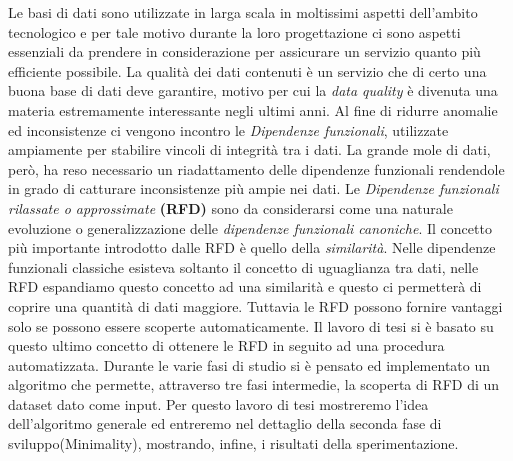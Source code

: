 Le basi di dati sono utilizzate in larga scala in moltissimi aspetti dell'ambito tecnologico e per tale motivo durante la loro progettazione ci sono aspetti essenziali da prendere in considerazione per assicurare un servizio quanto più efficiente possibile.
La qualità dei dati contenuti è un servizio che di certo una buona base di dati deve garantire, motivo per cui la \emph{data quality} è divenuta una materia estremamente interessante negli ultimi anni. 
Al fine di ridurre anomalie ed inconsistenze ci vengono incontro le \emph{Dipendenze funzionali}, utilizzate ampiamente per stabilire vincoli di integrità tra i dati.
La grande mole di dati, però, ha reso necessario un riadattamento delle dipendenze funzionali rendendole in grado di catturare inconsistenze più ampie nei dati. 
Le \emph{Dipendenze funzionali rilassate o approssimate} \textbf{(RFD)} sono da considerarsi come una naturale evoluzione o generalizzazione delle \emph{dipendenze funzionali canoniche}.
Il concetto più importante introdotto dalle RFD è quello della \emph{similarità}.
Nelle dipendenze funzionali classiche esisteva soltanto il concetto di uguaglianza tra dati, nelle RFD espandiamo questo concetto ad una similarità e questo ci permetterà di coprire una quantità di dati maggiore.
Tuttavia le RFD possono fornire vantaggi solo se possono essere scoperte automaticamente.
Il lavoro di tesi si è basato su questo ultimo concetto di ottenere le RFD in seguito ad una procedura automatizzata.
Durante le varie fasi di studio si è pensato ed implementato un algoritmo che permette, attraverso tre fasi intermedie, la scoperta di RFD di un dataset dato come input.
Per questo lavoro di tesi mostreremo l'idea dell'algoritmo generale ed entreremo nel dettaglio della seconda fase di sviluppo(Minimality), mostrando, infine, i risultati della sperimentazione.
